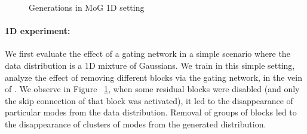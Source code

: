 



\begin{figure}[t]
    \centering
    \caption{Generations in MoG 1D setting}
    \label{fig:onedexperiment}
    \vspace{-3mm}
\end{figure}
\paragraph{1D experiment:}
We first evaluate the effect of a gating network in a simple scenario where the data distribution is a 1D mixture of Gaussians. 
We train \model{} in this simple setting, analyze the effect of removing different blocks via the gating network, in the vein of \cite{veit2016residual}.
We observe in Figure ~\ref{fig:onedexperiment}, when some residual blocks were disabled (and only the skip connection of that block was activated), it led to the disappearance of particular modes from the data distribution. 
Removal of groups of blocks led to the disappearance of clusters of modes from the generated distribution. 

